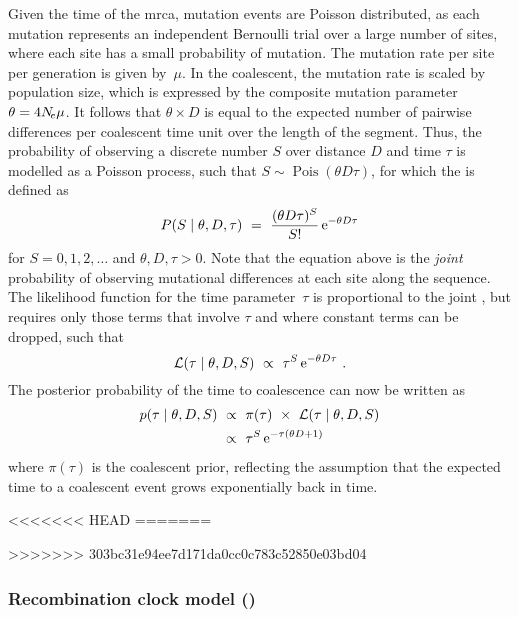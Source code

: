 Given the time of the \gls{mrca}, mutation events are Poisson distributed, as each mutation represents an independent Bernoulli trial over a large number of sites, where each site has a small probability of mutation.
The mutation rate per site per generation is given by~$\mu$.
In the coalescent, the mutation rate is scaled by population size, which is expressed by the composite mutation parameter ${\theta = 4N_{\!e}\mu}$.
It follows that ${\theta \times D}$ is equal to the expected number of pairwise differences per coalescent time unit over the length of the segment.
Thus, the probability of observing a discrete number $S$ over distance $D$ and time $\tau$ is modelled as a Poisson process, such that ${S \sim \operatorname{Pois}(\theta D \tau)}$, for which the  is defined as
\begin{equation}
	P(S \mid \theta,D,\tau) ~=~ \frac{(\theta D \tau)^S}{S!} \,\mathrm{e}^{-\theta D \tau}
\end{equation}
for ${S = 0,1,2,\ldots}$ and ${\theta,D,\tau > 0}$.
Note that the equation above is the \emph{joint} probability of observing mutational differences at each site along the sequence.
The likelihood function for the time parameter~$\tau$ is proportional to the joint , but requires only those terms that involve $\tau$ and where constant terms can be dropped, such that
\begin{equation}\label{eq:mut_like}
	\mathcal{L}(\tau \mid \theta,D,S) ~\propto~ \tau^S \,\mathrm{e}^{-\theta D \tau}\ .
\end{equation}
The posterior probability of the time to coalescence can now be written as
\begin{equation}\label{eq:mut_post}
\begin{split}
	p(\tau \mid \theta,D,S)
	&~\propto~ \pi(\tau) ~\times~ \mathcal{L}(\tau \mid \theta,D,S) \\
	&~\propto~ \tau^S \,\mathrm{e}^{- \tau (\theta D + 1)}
\end{split}
\end{equation}
where $\pi(\tau)$ is the coalescent prior, reflecting the assumption that the expected time to a coalescent event grows exponentially back in time.

<<<<<<< HEAD
=======

>>>>>>> 303bc31e94ee7d171da0cc0c783c52850e03bd04


%
\subsubsection{Recombination clock model (\ClockR)}
%

